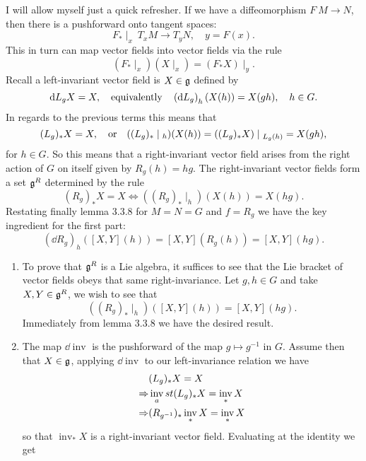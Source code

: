 \documentclass[12pt]{memoir}
\DeclareMathOperator{\inv}{inv}
\begin{document}
I will allow myself just a quick refresher. If we have a diffeomorphism $F\: M\to N$, then there is a pushforward onto tangent spaces:
$$F_\ast\mid_x\:T_x M\to T_{y}N,\quad y=F(x).$$
This in turn can map vector fields into vector fields via the rule
$$(F_\ast\mid_x)(X\mid_x)=(F_\ast X)\mid_{y}.$$
Recall a left-invariant vector field is $X\in\mathfrak{g}$ defined by 
$$\dd L_gX=X,\quad\text{equivalently}\quad\left(\dd L_g\right)_h (X(h)) = X(gh),\quad h\in G.$$ 
In regards to the previous terms this means that
$$(L_g)_\ast X=X,\word{or}((L_g)_\ast\mid_h)(X(h))=((L_g)_\ast X)\mid_{L_g(h)}=X(gh),$$
for $h\in G$. So this means that a right-invariant vector field arises from the right action of $G$ on itself given by $R_g(h)=hg$. The right-invariant vector fields form a set $\mathfrak{g}^R$ determined by the rule
$$(R_g)_\ast X=X\iff ((R_g)_\ast\mid_h)(X(h))=X(hg).$$
Restating finally lemma 3.3.8 for $M=N=G$ and $f=R_g$ we have the key ingredient for the first part: 
$$(\dd R_g)_h([X,Y](h))=[X,Y](R_g(h))=[X,Y](hg).$$
\begin{ptcbr}
	\begin{enumerate}
		\item To prove that $\mathfrak{g}^R$ is a Lie algebra, it suffices to see that the Lie bracket of vector fields obeys that same right-invariance. Let $g,h\in G$ and take $X,Y\in\mathfrak{g}^R$, we wish to see that 
		$$((R_g)_\ast\mid_h)([X,Y](h))=[X,Y](hg).$$
		Immediately from lemma 3.3.8 we have the desired result.
		\item The map $\dd\inv$ is the pushforward of the map $g\mapsto g^{-1}$ in $G$. Assume then that $X\in\mathfrak{g}$, applying $\dd\inv$ to our left-invariance relation we have
		\begin{align*}
			&(L_g)_\ast X=X\\
			\To&\inv_ast(L_g)_\ast X=\inv_\ast X\\
			\To&(R_{g^{-1}})_\ast\inv_\ast X=\inv_\ast X
		\end{align*}
		so that $\inv_\ast X$ is a right-invariant vector field. Evaluating at the identity we get 
	\end{enumerate}
\end{ptcbr}
\end{document}
